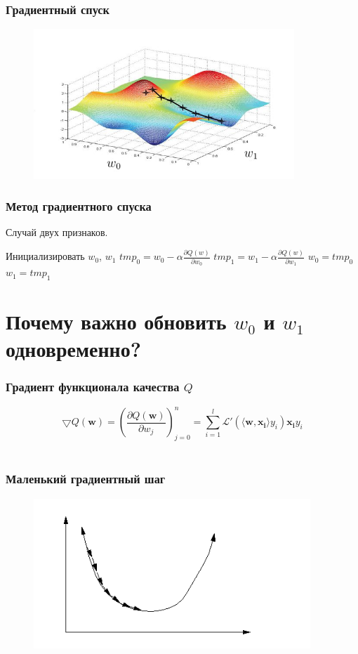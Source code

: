 \documentclass[10pt]{beamer}
\begin{document}
\begin{frame}\frametitle{Градиентный спуск}
	\begin{figure}[htbp]
	  \includegraphics[height=160pt, keepaspectratio = true]{images/gradient_descent}
	\end{figure}
\end{frame}

\begin{frame}\frametitle{Метод градиентного спуска}
	Случай двух признаков.\\
	\begin{algorithmic}[1]
     \State Инициализировать $w_0$, $w_1$
       \State $tmp_0 =  w_0 - \alpha \frac{\partial Q(w)}{\partial w_0}$
       \State $tmp_1 =  w_1 - \alpha \frac{\partial Q(w)}{\partial w_1}$
       \State $w_0 = tmp_0$
       \State $w_1 = tmp_1$
     \EndRepeat
    \EndFunction
  \end{algorithmic}
\end{frame}

\section{Почему важно обновить $w_0$ и $w_1$ одновременно?}

\begin{frame}\frametitle{Градиент функционала качества $Q$}
	$$\bigtriangledown Q(\mathbf{w}) = (\frac{\partial Q(\mathbf{w})}{\partial w_j})_{j=0}^n = \sum\limits_{i=1}^l \mathcal{L}'(\langle \mathbf{w}, \mathbf{x_i} \rangle y_i) \mathbf{x_i} y_i$$\\
\end{frame}

\begin{frame}\frametitle{Маленький градиентный шаг}
	\begin{figure}[htbp]
	  \includegraphics[height=160pt, keepaspectratio = true]{images/learning_rate_small}
	\end{figure}
\end{frame}
\end{document}
